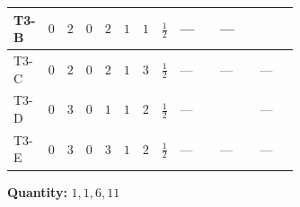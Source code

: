 \documentclass[8pt]{article}
\begin{document}
\begin{landscape}
\begin{longtable}{@{}llcccccc >{\raggedright\arraybackslash}p{0.21\linewidth} >{\raggedright\arraybackslash}p{0.21\linewidth} >{\raggedright\arraybackslash}p{0.21\linewidth}@{}}
\midrule
T3-B & $0$ & $2$ & $0$ & $2$ & $1$ & $1$ & $\frac{1}{2}$ & --- & --- & \scriptsize\adjustbox{max width=\linewidth}{$\begin{gathered} \frac{3 i g_{2}^{2} \overline{y_{1}} \overline{y_{2}}}{4 MF}\end{gathered}$} \\
\midrule
T3-C & $0$ & $2$ & $0$ & $2$ & $1$ & $3$ & $\frac{1}{2}$ & --- & --- & --- \\
\midrule
T3-D & $0$ & $3$ & $0$ & $1$ & $1$ & $2$ & $\frac{1}{2}$ & --- & \scriptsize\adjustbox{max width=\linewidth}{$\begin{gathered} \frac{\sqrt{2} \cdot 3^{\frac{3}{4}} i g_{2}^{2} \overline{y_{1}} \overline{y_{2}}}{3 MF}\end{gathered}$} & --- \\
\midrule
T3-E & $0$ & $3$ & $0$ & $3$ & $1$ & $2$ & $\frac{1}{2}$ & --- & --- & --- \\
\midrule
\bottomrule
\end{longtable}
\clearpage
\noindent\textbf{Quantity: }$\mathrm{1,1,6,11}$\par\smallskip

\end{landscape}
\end{document}
